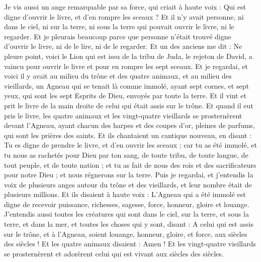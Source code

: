 \begin{multicols}{2}
Je vis aussi un ange remarquable par sa force, qui criait à haute voix : Qui est digne d'ouvrir le livre, et d'en rompre les sceaux ?
Et il n’y avait personne, ni dans le ciel, ni sur la terre, ni sous la terre qui pouvait ouvrir le livre, ni le regarder.
Et je pleurais beaucoup parce que personne n'était trouvé digne d'ouvrir le livre, ni de le lire, ni de le regarder.
Et un des anciens me dit : Ne pleure point, voici le Lion qui est issu de la tribu de Juda, le rejeton de David, a vaincu pour ouvrir le livre et pour en rompre les sept sceaux.
Et je regardai, et voici il y avait au milieu du trône et des quatre animaux, et au milieu des vieillards, un Agneau qui se tenait là comme immolé, ayant sept cornes, et sept yeux, qui sont les sept Esprits de Dieu, envoyés par toute la terre.
Et il vint et prit le livre de la main droite de celui qui était assis sur le trône.
Et quand il eut pris le livre, les quatre animaux et les vingt-quatre vieillards se prosternèrent devant l'Agneau, ayant chacun des harpes et des coupes d'or, pleines de parfums, qui sont les prières des saints.
Et ils chantaient un cantique nouveau, en disant : Tu es digne de prendre le livre, et d'en ouvrir les sceaux ; car tu as été immolé, et tu nous as rachetés pour Dieu par ton sang, de toute tribu, de toute langue, de tout peuple, et de toute nation ;
et tu as fait de nous des rois et des sacrificateurs pour notre Dieu ; et nous régnerons sur la terre.
Puis je regardai, et j'entendis la voix de plusieurs anges autour du trône et des vieillards, et leur nombre était de plusieurs millions.
Et ils disaient à haute voix : L'Agneau qui a été immolé est digne de recevoir puissance, richesses, sagesse, force, honneur, gloire et louange.
J'entendis aussi toutes les créatures qui sont dans le ciel, sur la terre, et sous la terre, et dans la mer, et toutes les choses qui y sont, disant : A celui qui est assis sur le trône, et à l'Agneau, soient louange, honneur, gloire, et force, aux siècles des siècles !
Et les quatre animaux disaient : Amen ! Et les vingt-quatre vieillards se prosternèrent et adorèrent celui qui est vivant aux siècles des siècles.

\end{multicols}
